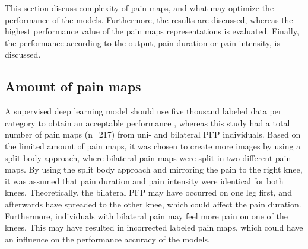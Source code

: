 This section discuss complexity of pain maps, and what may optimize the performance of the models. Furthermore, the results are discussed, whereas the highest performance value of the pain maps representations is evaluated. Finally, the performance according to the output, pain duration or pain intensity, is discussed.

\subsection*{Amount of pain maps}
A supervised deep learning model should use five thousand labeled data per category to obtain an acceptable performance \citep{Goodfellow2016}, whereas this study had a total number of pain maps (n=217) from uni- and bilateral PFP individuals. Based on the limited amount of pain maps, it was chosen to create more images by using a split body approach, where bilateral pain maps were split in two different pain maps. By using the split body approach and mirroring the pain to the right knee, it was assumed that pain duration and pain intensity were identical for both knees. Theoretically, the bilateral PFP may have occurred on one leg first, and afterwards have spreaded to the other knee, which could affect the pain duration. Furthermore, individuals with bilateral pain may feel more pain on one of the knees. This may have resulted in incorrected labeled pain maps, which could have an influence on the performance accuracy of the models.

